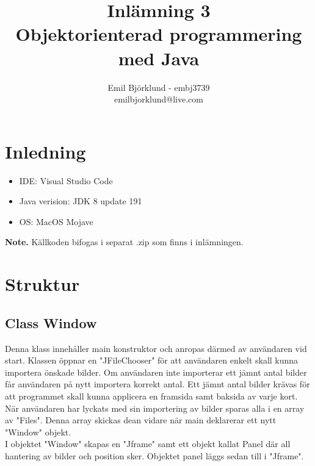 \documentclass[hidelinks]{article}
\title{Inlämning 3 \\ Objektorienterad programmering med Java}
\author{Emil Björklund - embj3739 \\ emilbjorklund@live.com}
\begin{document}
\maketitle 
\newpage

\section*{Inledning}
\begin {itemize}
\item IDE: Visual Studio Code
\item Java verision: JDK 8 update 191
\item OS: MacOS Mojave
\end{itemize}

\textbf{Note.} Källkoden bifogas i separat .zip som finns i inlämningen.

\section*{Struktur}
\subsection*{Class Window}
Denna klass innehåller main konstruktor och anropas därmed av användaren vid start.
Klassen öppnar en "JFileChooser" för att användaren enkelt skall kunna importera önskade bilder.
Om användaren inte importerar ett jämnt antal bilder får användaren på nytt importera korrekt antal. Ett jämnt antal bilder
krävas för att programmet skall kunna applicera en framsida samt baksida av varje kort. 
När användaren har lyckats med sin importering av bilder sparas alla i en array av "Files". Denna array skickas dean vidare när main
deklarerar ett nytt "Window" objekt. \\
I objektet "Window" skapas en "Jframe" samt ett objekt kallat Panel där all hantering av bilder och position sker.
Objektet panel läggs sedan till i "Jframe".
\end{document}
